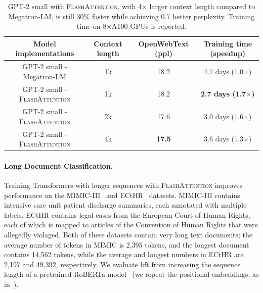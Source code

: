 \documentclass{article}
\newcommand{\sysname}{\textsc{FlashAttention}\xspace}
\begin{document}
\begin{table}[h]
\vspace{-3mm}
  \captionsetup{font=small}
  \small
  \centering
  \caption{\label{table:gpt2_long_context}GPT-2 small with \sysname, with 4$\times$ larger context
    length compared to Megatron-LM, is still 30\% faster while achieving 0.7
    better perplexity. Training time on 8$\times$A100 GPUs is reported.}
  \setlength{\tabcolsep}{5pt}
  \vspace{1em}
  \iftoggle{arxiv}{}{
      \resizebox{0.8\linewidth}{!}
  }
  {
    \begin{tabular}{@{}c|ccc@{}}
      Model implementations & Context length &\multicolumn{1}{c}{OpenWebText (ppl)}&\multicolumn{1}{c}{Training time (speedup)} \\
    \hline
      GPT-2 small - Megatron-LM & 1k & 18.2 & 4.7 days (1.0$\times$) \\
      GPT-2 small - \sysname & 1k & 18.2 & \textbf{2.7 days (1.7$\times$)} \\
      GPT-2 small - \sysname & 2k & 17.6 & 3.0 days (1.6$\times$) \\
      GPT-2 small - \sysname & 4k & \textbf{17.5} & 3.6 days (1.3$\times$) \\
    \end{tabular}
  }
  \vspace{-3mm}
\end{table}

\paragraph{Long Document Classification.}
Training Transformers with longer sequences with \sysname improves performance on the MIMIC-III~\citep{johnson2016mimic} and ECtHR~\citep{chalkidis-etal-2019-neural, chalkidis-et-al-2021-ecthr} datasets.
MIMIC-III contains intensive care unit patient discharge summaries, each annotated with multiple labels.
ECtHR contains legal cases from the European Court of Human Rights, each of which is mapped to articles of the Convention of Human Rights that were allegedly violaged.
Both of these datasets contain very long text documents; the average number of tokens in MIMIC is 2,395 tokens, and the longest document contains 14,562 tokens, while the average and longest numbers in ECtHR are 2,197 and 49,392, respectively.
We evaluate lift from increasing the sequence length of a pretrained RoBERTa model~\citep{liu2019roberta} (we repeat the positional embeddings, as in~\citet{beltagy2020longformer}).
\end{document}
